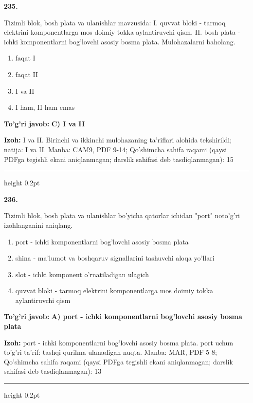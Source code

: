 \documentclass[10pt,a4paper]{article}
\begin{document}
{\bfseries\sffamily\color{ink} 235.}
\par
Tizimli blok, bosh plata va ulanishlar mavzusida: I. quvvat bloki - tarmoq elektrini komponentlarga mos doimiy tokka aylantiruvchi qism. II. bosh plata - ichki komponentlarni bog'lovchi asosiy bosma plata. Mulohazalarni baholang.
\begin{enumerate}[label=\Alph*),leftmargin=9mm]
\item faqat I
\item faqat II
\item I va II
\item I ham, II ham emas
\end{enumerate}
\begin{tcolorbox}[enhanced,breakable,colback=teal!4,colframe=teal!60!black,boxrule=0.45pt,arc=1.2mm,left=2.7mm,right=2.7mm,top=1.8mm,bottom=1.8mm,before skip=2mm,after skip=2mm]
{\bfseries\sffamily\color{teal}To'g'ri javob:} \textbf{C) I va II}
\par\smallskip
{\bfseries Izoh:} I va II. Birinchi va ikkinchi mulohazaning ta'riflari alohida tekshirildi; natija: I va II. Manba: CAM9, PDF 9-14; Qo'shimcha sahifa raqami (qaysi PDFga tegishli ekani aniqlanmagan; darslik sahifasi deb tasdiqlanmagan): 15
\end{tcolorbox}
\vspace{2mm}\hrule height 0.2pt\vspace{3mm}

{\bfseries\sffamily\color{ink} 236.}
\par
Tizimli blok, bosh plata va ulanishlar bo'yicha qatorlar ichidan "port" noto'g'ri izohlanganini aniqlang.
\begin{enumerate}[label=\Alph*),leftmargin=9mm]
\item port - ichki komponentlarni bog'lovchi asosiy bosma plata
\item shina - ma'lumot va boshqaruv signallarini tashuvchi aloqa yo'llari
\item slot - ichki komponent o'rnatiladigan ulagich
\item quvvat bloki - tarmoq elektrini komponentlarga mos doimiy tokka aylantiruvchi qism
\end{enumerate}
\begin{tcolorbox}[enhanced,breakable,colback=teal!4,colframe=teal!60!black,boxrule=0.45pt,arc=1.2mm,left=2.7mm,right=2.7mm,top=1.8mm,bottom=1.8mm,before skip=2mm,after skip=2mm]
{\bfseries\sffamily\color{teal}To'g'ri javob:} \textbf{A) port - ichki komponentlarni bog'lovchi asosiy bosma plata}
\par\smallskip
{\bfseries Izoh:} port - ichki komponentlarni bog'lovchi asosiy bosma plata. port uchun to'g'ri ta'rif: tashqi qurilma ulanadigan nuqta. Manba: MAR, PDF 5-8; Qo'shimcha sahifa raqami (qaysi PDFga tegishli ekani aniqlanmagan; darslik sahifasi deb tasdiqlanmagan): 13
\end{tcolorbox}
\vspace{2mm}\hrule height 0.2pt\vspace{3mm}
\end{document}
